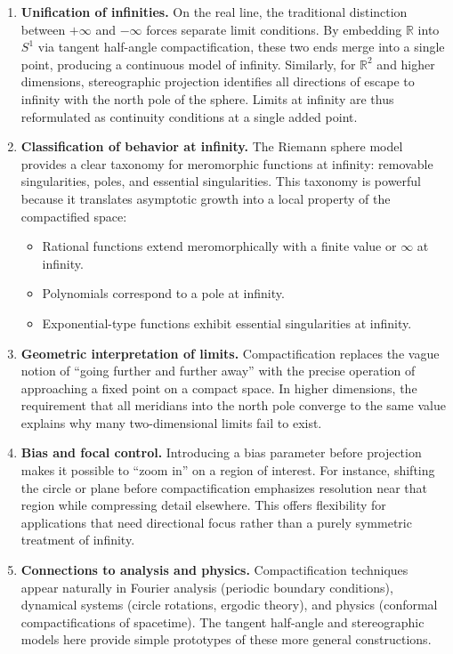\documentclass[12pt]{article}
\theoremstyle{remark}
\begin{document}
\begin{enumerate}
    \item \textbf{Unification of infinities.}  
    On the real line, the traditional distinction between $+\infty$ and $-\infty$ 
    forces separate limit conditions. By embedding $\mathbb{R}$ into $S^1$ via 
    tangent half-angle compactification, these two ends merge into a single 
    point, producing a continuous model of infinity. Similarly, for 
    $\mathbb{R}^2$ and higher dimensions, stereographic projection identifies 
    all directions of escape to infinity with the north pole of the sphere. 
    Limits at infinity are thus reformulated as continuity conditions at a 
    single added point.

    \item \textbf{Classification of behavior at infinity.}  
    The Riemann sphere model provides a clear taxonomy for meromorphic functions 
    at infinity: removable singularities, poles, and essential singularities. 
    This taxonomy is powerful because it translates asymptotic growth into 
    a local property of the compactified space:
    \begin{itemize}
        \item Rational functions extend meromorphically with a finite value or $\infty$ at infinity.  
        \item Polynomials correspond to a pole at infinity.  
        \item Exponential-type functions exhibit essential singularities at infinity.  
    \end{itemize}

    \item \textbf{Geometric interpretation of limits.}  
    Compactification replaces the vague notion of “going further and further 
    away” with the precise operation of approaching a fixed point on a compact 
    space. In higher dimensions, the requirement that all meridians into the 
    north pole converge to the same value explains why many two-dimensional 
    limits fail to exist.

    \item \textbf{Bias and focal control.}  
    Introducing a bias parameter before projection makes it possible to 
    “zoom in” on a region of interest. For instance, shifting the circle or 
    plane before compactification emphasizes resolution near that region while 
    compressing detail elsewhere. This offers flexibility for applications that 
    need directional focus rather than a purely symmetric treatment of infinity.

    \item \textbf{Connections to analysis and physics.}  
    Compactification techniques appear naturally in Fourier analysis (periodic 
    boundary conditions), dynamical systems (circle rotations, ergodic theory), 
    and physics (conformal compactifications of spacetime). The tangent 
    half-angle and stereographic models here provide simple prototypes of these 
    more general constructions.
\end{enumerate}
\end{document}
